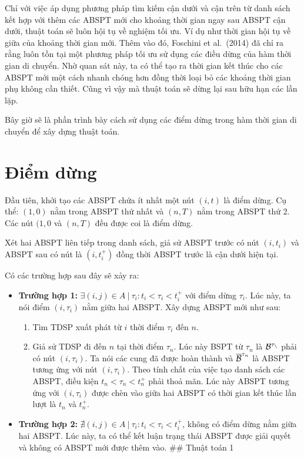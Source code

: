 \documentclass[14pt,oneside]{scrbook}
\providecommand{\tightlist}{\setlength{\itemsep}{\smallskipamount}\setlength{\parskip}{0pt}}
\begin{document}
Chỉ với việc áp dụng phương pháp tìm kiếm cận dưới và cận trên từ danh
sách kết hợp với thêm các ABSPT mới cho khoảng thời gian ngay sau ABSPT
cận dưới, thuật toán sẽ luôn hội tụ về nghiệm tối ưu. Ví dụ như thời
gian hội tụ về giữa của khoảng thời gian mới. Thêm vào đó, Foschini et
al.~(2014) đã chỉ ra rằng luôn tồn tại một phương pháp tối ưu sử dụng
các điều dừng của hàm thời gian di chuyển. Nhờ quan sát này, ta có thể
tạo ra thời gian kết thúc cho các ABSPT mới một cách nhanh chóng hơn
đồng thời loại bỏ các khoảng thời gian phụ không cần thiết. Cũng vì vậy
mà thuật toán sẽ dừng lại sau hữu hạn các lần lặp.

Bây giờ sẽ là phần trình bày cách sử dụng các điểm dừng trong hàm thời
gian di chuyển để xây dựng thuật toán.

\section{Điểm dừng}\label{ux111iux1ec3m-dux1eebng}

Đầu tiên, khởi tạo các ABSPT chứa ít nhất một nút \((i, t)\) là điểm
dừng. Cụ thể: \((1, 0)\) nằm trong ABSPT thứ nhất và \((n, T)\) nằm
trong ABSPT thứ 2. Các nút \((1, 0\) và \((n, T)\) đều được coi là điểm
dừng.

Xét hai ABSPT liên tiếp trong danh sách, giả sử ABSPT trước có nút
\((i, t_i)\) và ABSPT sau có nút là \((i, t_i^+)\) đồng thời ABSPT trước
là cận dưới hiện tại.

Có các trường hợp sau đây sẽ xảy ra:

\begin{itemize}
\tightlist
\item
  \textbf{Trường hợp 1:}
  \(\exists (i, j) \in A\ |\ \tau_i:t_i < \tau_i < t_i^+\) với điểm dừng
  \(\tau_i\). Lúc này, ta nói điểm \((i, \tau_i)\) nằm giữa hai ABSPT.
  Xây dựng ABSPT mới như sau:

  \begin{enumerate}
  \def\labelenumi{\arabic{enumi}.}
  \tightlist
  \item
    Tìm TDSP xuất phát từ \(i\) thời điểm \(\tau_i\) đến \(n\).
  \item
    Giả sử TDSP đi đến \(n\) tại thời điểm \(\tau_n\). Lúc này BSPT từ
    \(\tau_n\) là \(\cal B ^{\tau_n}\) phải có nút \((i, \tau_i)\). Ta
    nói các cung đã được hoàn thành và \(\overline {\cal B} ^{\tau_n}\)
    là ABSPT tương ứng với nút \((i, \tau_i)\). Theo tính chất của việc
    tạo danh sách các ABSPT, điều kiện \(t_n < \tau_n < t_n^+\) phải
    thoả mãn. Lúc này ABSPT tương ứng với \((i, \tau_i)\) được chèn vào
    giữa hai ABSPT có thời gian kết thúc lần lượt là \(t_n\) và
    \(t_n^+\).
  \end{enumerate}
\item
  \textbf{Trường hợp 2:}
  \(\nexists (i, j)\in A\ |\ \tau_i: t_i < \tau_i < t_i^+\), không có
  điểm dừng nằm giữa hai ABSPT. Lúc này, ta có thể kết luận trạng thái
  ABSPT được giải quyết và không có ABSPT mới được thêm vào. \#\# Thuật
  toán 1
\end{itemize}
\end{document}
